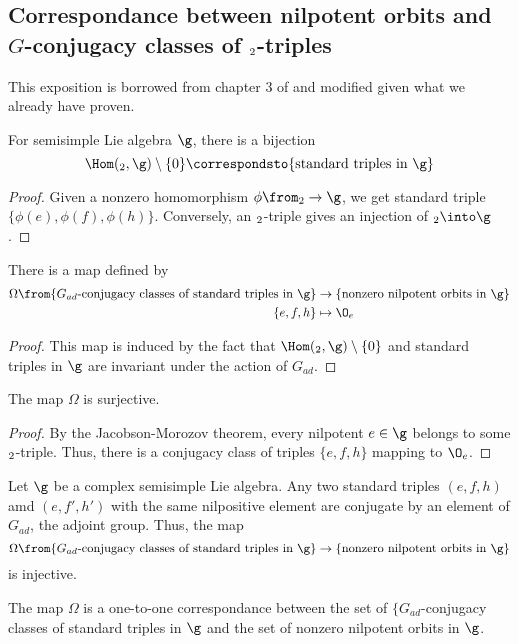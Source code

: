 \subsection{Correspondance between nilpotent orbits and
  \(G\)-conjugacy classes of \(\sl_2\)-triples}
This exposition is borrowed from chapter 3 of \cite{cm} and modified
given what we already have proven.
\begin{prop}
  For semisimple Lie algebra \(\g\), there is a bijection \[
    \Hom(\sl_2,\g) \setminus \{0\} \correspondsto \{\text{standard
      triples in }\g\}
  \]
\end{prop}
\begin{proof}
  Given a nonzero homomorphism \(\phi \from \sl_2 \to \g\), we get
  standard triple \(\{\phi(e), \phi(f), \phi(h)\}\). Conversely, an
  \(\sl_2\)-triple gives an injection of \(\sl_2 \into \g\).
\end{proof}
\begin{prop}
  There is a map defined by
  \begin{align*}
    \Omega \from \{G_{ad}\text{-conjugacy classes of standard triples
    in }\g\} & \to \{\text{nonzero nilpotent orbits in }\g\}\\
    \{e,f,h\} & \mapsto \O_e
  \end{align*}
\end{prop}
\begin{proof}
  This map is induced by the fact that \(\Hom(\sl_2,\g) \setminus
  \{0\}\) and standard triples in \(\g\) are invariant under the
  action of \(G_{ad}\).
\end{proof}
\begin{prop}
  The map \(\Omega\) is surjective.
\end{prop}
\begin{proof}
  By the Jacobson-Morozov theorem, every nilpotent \(e \in \g\)
  belongs to some \(\sl_2\)-triple. Thus, there is a conjugacy class
  of triples \(\{e,f,h\}\) mapping to \(\O_e\).
\end{proof}
\begin{prop}
  Let \(\g\) be a complex semisimple Lie algebra. Any two standard
  triples \((e,f,h)\) amd \((e,f',h')\) with the same nilpositive
  element are conjugate by an element of \(G_{ad}\), the adjoint
  group. Thus, the map \[
    \Omega \from \{G_{ad}\text{-conjugacy classes of standard triples
      in }\g\} \to \{\text{nonzero nilpotent orbits in }\g\}
  \]
  is injective.
\end{prop}
\begin{thm}
  The map \(\Omega\) is a one-to-one correspondance between the set
  of \(\{G_{ad}\)-conjugacy classes of standard triples in \(\g\)
  and the set of nonzero nilpotent orbits in \(\g\).
\end{thm}
